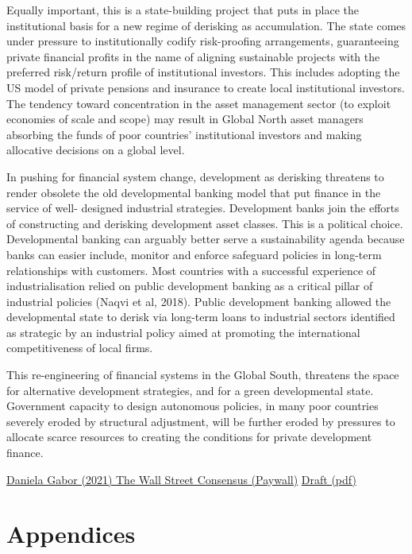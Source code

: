 \documentclass[
]{book}
\begin{document}
Equally important, this is a state-building project that puts in place the institutional
basis for a new regime of derisking as accumulation. The state comes under pressure
to institutionally codify risk-proofing arrangements, guaranteeing private financial
profits in the name of aligning sustainable projects with the preferred risk/return profile
of institutional investors. This includes adopting the US model of private pensions and
insurance to create local institutional investors. The tendency toward concentration in
the asset management sector (to exploit economies of scale and scope) may result in
Global North asset managers absorbing the funds of poor countries' institutional
investors and making allocative decisions on a global level.

In pushing for financial system change, development as derisking threatens to render
obsolete the old developmental banking model that put finance in the service of well-
designed industrial strategies. Development banks join the efforts of constructing and
derisking development asset classes. This is a political choice. Developmental banking
can arguably better serve a sustainability agenda because banks can easier include,
monitor and enforce safeguard policies in long-term relationships with customers. Most
countries with a successful experience of industrialisation relied on public development
banking as a critical pillar of industrial policies (Naqvi et al, 2018). Public development
banking allowed the developmental state to derisk via long-term loans to industrial
sectors identified as strategic by an industrial policy aimed at promoting the
international competitiveness of local firms.

This re-engineering of financial systems in the Global South, threatens the space for
alternative development strategies, and for a green developmental state. Government
capacity to design autonomous policies, in many poor countries severely eroded by
structural adjustment, will be further eroded by pressures to allocate scarce resources
to creating the conditions for private development finance.

\href{https://onlinelibrary.wiley.com/doi/abs/10.1111/dech.12645}{Daniela Gabor (2021) The Wall Street Consensus (Paywall)}
\href{pdf/Gabor_2021_Wall_Street_Consensus.pdf}{Draft (pdf)}

\hypertarget{part-appendices}{%
\part{Appendices}\label{part-appendices}}
\end{document}
